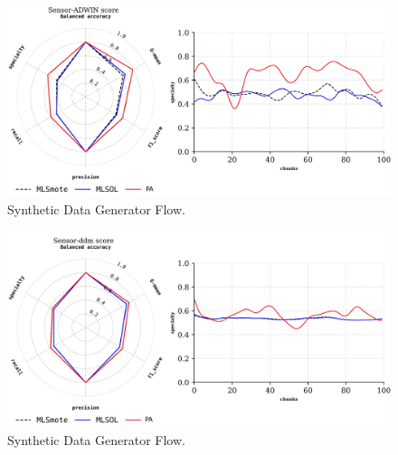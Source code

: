 \begin{figure}[!ht]
	\centering
	\includegraphics[width=1\linewidth]{4_Taxonomy/figures/exp_3.png}
	\caption{Synthetic Data Generator Flow.}
	\label{fig:4_first_proposal_result_exp_3}
\end{figure}

\begin{figure}[!ht]
	\centering
	\includegraphics[width=1\linewidth]{4_Taxonomy/figures/exp_4.png}
	\caption{Synthetic Data Generator Flow.}
	\label{fig:4_first_proposal_result_exp_4}
\end{figure}


